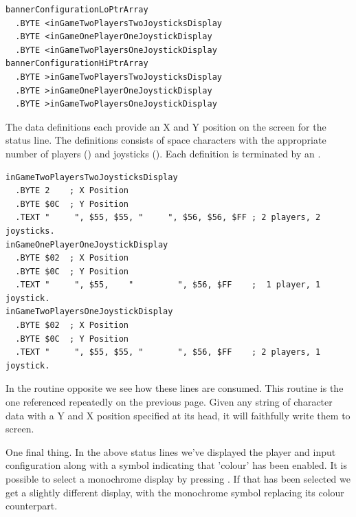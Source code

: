 \clearpage

\begin{lstlisting}[basicstyle=\scriptsize\ttfamily, escapechar=\%]
bannerConfigurationLoPtrArray
  .BYTE <inGameTwoPlayersTwoJoysticksDisplay
  .BYTE <inGameOnePlayerOneJoystickDisplay
  .BYTE <inGameTwoPlayersOneJoystickDisplay
bannerConfigurationHiPtrArray
  .BYTE >inGameTwoPlayersTwoJoysticksDisplay
  .BYTE >inGameOnePlayerOneJoystickDisplay
  .BYTE >inGameTwoPlayersOneJoystickDisplay
\end{lstlisting}

The data definitions each provide an X and Y position on the screen for the status line. The definitions
consists of space characters with the appropriate number of players () and
joysticks (). Each definition is terminated by an .
\begin{lstlisting}[basicstyle=\scriptsize\ttfamily, escapechar=\%]
inGameTwoPlayersTwoJoysticksDisplay
  .BYTE 2    ; X Position
  .BYTE $0C  ; Y Position
  .TEXT "     ", $55, $55, "     ", $56, $56, $FF ; 2 players, 2 joysticks.
inGameOnePlayerOneJoystickDisplay
  .BYTE $02  ; X Position
  .BYTE $0C  ; Y Position
  .TEXT "     ", $55,    "         ", $56, $FF    ;  1 player, 1 joystick.
inGameTwoPlayersOneJoystickDisplay
  .BYTE $02  ; X Position
  .BYTE $0C  ; Y Position
  .TEXT "     ", $55, $55, "       ", $56, $FF    ; 2 players, 1 joystick.
\end{lstlisting}

In the  routine opposite we see how these lines are consumed. This routine is
the one referenced repeatedly on the previous page. Given any string of character data with a Y and X
position specified at its head, it will faithfully write them to screen.

One final thing. In the above status lines we've displayed the player and input configuration along with a symbol indicating that 'colour' has been
enabled. It is possible to select a monochrome display by pressing . If that has been selected we get a slightly different
display, with the monochrome symbol replacing its colour counterpart.

